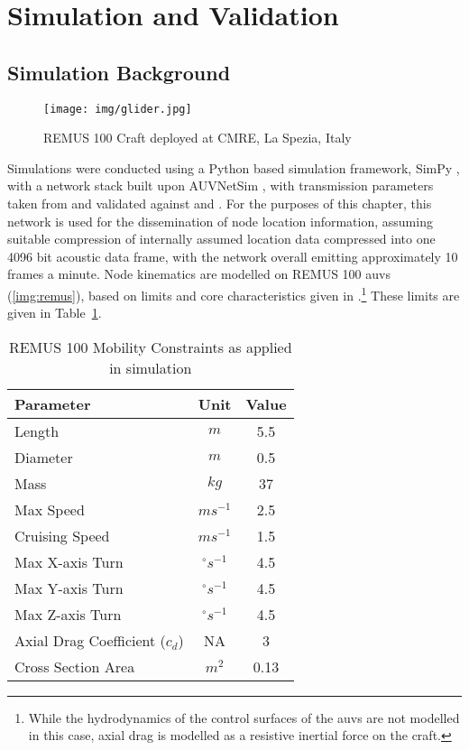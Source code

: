 \section{Simulation and Validation}\label{sec:sim_and_valid}

\subsection{Simulation Background}

\begin{figure}
	\centering
	\texttt{[image: img/glider.jpg]}
	\caption{REMUS 100 Craft deployed at CMRE, La Spezia, Italy}
	\label{img:remus}
\end{figure}

Simulations were conducted using a Python based simulation framework, SimPy \cite{Mueller2003SimPy}, with a network stack built upon AUVNetSim \cite{Miquel2008}, with transmission parameters taken from and validated against \cite{Stojanovic2007} and \cite{Stefanov2011}.
For the purposes of this chapter, this network is used for the dissemination of node location information, assuming suitable compression of internally assumed location data compressed into one 4096 bit acoustic data frame, with the network overall emitting approximately 10 frames a minute.
Node kinematics are modelled on REMUS 100 \glspl{auv} (\autoref{img:remus}), based on limits and core characteristics given in \cite{Mcewen2001,Milgram2001,Samad2011}.\footnote{While the hydrodynamics of the control surfaces of the \glspl{auv} are not modelled in this case, axial drag is modelled as a resistive inertial force on the craft.}
These limits are given in Table~\ref{tab:mobility_sysconstraints}.


\begin{table}
  \caption{REMUS 100 Mobility Constraints as applied in simulation} \label{tab:mobility_sysconstraints}
  \begin{center}
    \setlength{\tabcolsep}{8pt}
    \begin{tabular}{lcc}
      \toprule
      Parameter & Unit & Value \\
      \midrule
      Length & $m$ & 5.5\\
      Diameter & $m$ & 0.5\\
      Mass & $kg$ & 37 \\ 
      Max Speed & $ms^{-1}$ & 2.5\\
      Cruising Speed & $ms^{-1}$ & 1.5\\
      Max X-axis Turn & $^{\circ} s^{-1}$ & 4.5\\
      Max Y-axis Turn & $^{\circ} s^{-1}$ & 4.5\\
      Max Z-axis Turn & $^{\circ} s^{-1}$ & 4.5\\
      Axial Drag Coefficient ($c_d$) & NA & 3\\
      Cross Section Area & $m^2$ & 0.13\\
      \bottomrule
    \end{tabular}
    \setlength{\tabcolsep}{6pt}
  \end{center}
\end{table}

